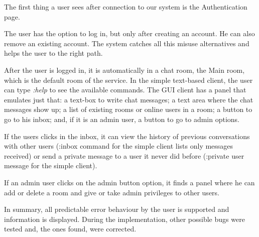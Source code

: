 The first thing a user sees after connection to our system is the Authentication page.
    
The user has the option to log in, but only after creating an account. He can also remove an existing account. The system catches all this misuse alternatives and helps the user to the right path.

After the user is logged in, it is automatically in a chat room, the Main room, which is the default room of the service. In the simple text-based client, the user can type \emph{:help} to see the available commands. The GUI client has a panel that emulates just that: a text-box to write chat messages; a text area where the chat messages show up; a list of existing rooms or online users in a room; a button to go to his inbox; and, if it is an admin user, a button to go to admin options.

If the users clicks in the inbox, it can view the history of previous conversations with other users (:inbox command for the simple client lists only messages received) or send a private message to a user it never did before (:private user message for the simple client).

If an admin user clicks on the admin button option, it finds a panel where he can add or delete a room and give or take admin privileges to other users. 

In summary, all predictable error behaviour by the user is supported and information is displayed. During the implementation, other possible bugs were tested and, the ones found, were corrected.